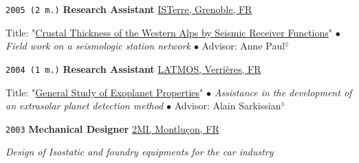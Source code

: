 \noindent \texttt{2005 (2 m.)} \tab \textbf{Research Assistant} \tab
\href{https://www.isterre.fr/}{ISTerre, Grenoble, FR}
\vspace{.3em}
\begin{adjustwidth}{7em}{}
Title: "\ul{Crustal Thickness of the Western Alps by Seismic Receiver Functions}"
$\bullet$ 
\textit{Field work on a seismologic station network $\bullet$} Advisor: Anne Paul$^\lozenge$
\end{adjustwidth}
\vspace{.5em}

\noindent \texttt{2004 (1 m.)} \tab \textbf{Research Assistant} \tab
\href{https://www3.latmos.ipsl.fr/index.php/fr/accueil-latmos}{LATMOS, Verrières, FR}
\vspace{.3em}
\begin{adjustwidth}{7em}{}
Title: "\ul{General Study of Exoplanet Properties}"
$\bullet$ 
\textit{Assistance in the development of an extrasolar planet detection method $\bullet$} Advisor: Alain Sarkissian$^\lozenge$
\end{adjustwidth}
\vspace{.5em}

\noindent \texttt{2003} \tab \textbf{Mechanical Designer} \tab
\href{http://www.2migroup.eu/fr/}{2MI, Montluçon, FR}
\vspace{.3em}
\begin{adjustwidth}{7em}{}
\textit{Design of Isostatic and foundry equipments for the car industry}
\end{adjustwidth}